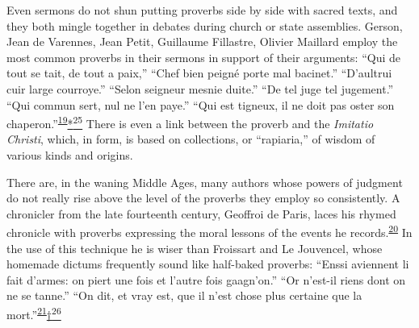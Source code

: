 Even sermons do not shun putting proverbs side by side with sacred
texts, and they both mingle together in debates during church or state
assemblies. Gerson, Jean de Varennes, Jean Petit, Guillaume Fillastre,
Olivier Maillard employ the most common proverbs in their sermons in
support of their arguments: ``Qui de tout se tait, de tout a paix,''
``Chef bien peigné porte mal bacinet.'' ``D'aultrui cuir large
courroye.'' ``Selon seigneur mesnie duite.'' ``De tel juge tel
jugement.'' ``Qui commun sert, nul ne l'en paye.''
\protect\hypertarget{18_Chapter_Eleven__THE_FORMS_OF_THO.xhtmlux5cux23page_275}{}{}``Qui
est tigneux, il ne doit pas oster son
chaperon.''\textsuperscript{\protect\hypertarget{18_Chapter_Eleven__THE_FORMS_OF_THO.xhtmlux5cux23id_594}{\protect\hyperlink{23_NOTES.xhtmlux5cux23id_595}{19}}}\protect\hypertarget{18_Chapter_Eleven__THE_FORMS_OF_THO.xhtmlux5cux23id_2613}{\protect\hyperlink{23_NOTES.xhtmlux5cux23id_2614}{*\textsuperscript{25}}}
There is even a link between the proverb and the \emph{Imitatio
Christi}, which, in form, is based on collections, or ``rapiaria,'' of
wisdom of various kinds and origins.

There are, in the waning Middle Ages, many authors whose powers of
judgment do not really rise above the level of the proverbs they employ
so consistently. A chronicler from the late fourteenth century, Geoffroi
de Paris, laces his rhymed chronicle with proverbs expressing the moral
lessons of the events he
records.\textsuperscript{\protect\hypertarget{18_Chapter_Eleven__THE_FORMS_OF_THO.xhtmlux5cux23id_592}{\protect\hyperlink{23_NOTES.xhtmlux5cux23id_593}{20}}}
In the use of this technique he is wiser than Froissart and Le
Jouvencel, whose homemade dictums frequently sound like half-baked
proverbs: ``Enssi aviennent li fait d'armes: on piert une fois et
l'autre fois gaagn'on.'' ``Or n'est-il riens dont on ne se tanne.'' ``On
dit, et vray est, que il n'est chose plus certaine que la
mort.''\textsuperscript{\protect\hypertarget{18_Chapter_Eleven__THE_FORMS_OF_THO.xhtmlux5cux23id_590}{\protect\hyperlink{23_NOTES.xhtmlux5cux23id_591}{21}}}\protect\hypertarget{18_Chapter_Eleven__THE_FORMS_OF_THO.xhtmlux5cux23id_2615}{\protect\hyperlink{23_NOTES.xhtmlux5cux23id_2616}{†\textsuperscript{26}}}

